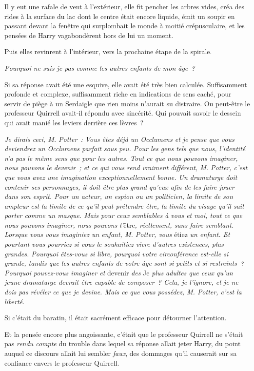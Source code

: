 Il y eut une rafale de vent à l'extérieur, elle fit pencher les arbres vides, créa des rides à la surface du lac dont le centre était encore liquide, émit un soupir en passant devant la fenêtre qui surplombait le monde à moitié crépusculaire, et les pensées de Harry vagabondèrent hors de lui un moment.

Puis elles revinrent à l'intérieur, vers la prochaine étape de la spirale.

\emph{Pourquoi ne suis-je pas comme les autres enfants de mon âge~?}

Si sa réponse avait été une esquive, elle avait été très bien calculée.
Suffisamment profonde et complexe, suffisamment riche en indications de sens caché, pour servir de piège à un Serdaigle que rien moins n'aurait su distraire.
Ou peut-être le professeur Quirrell avait-il répondu avec sincérité.
Qui pouvait savoir le dessein qui avait manié les leviers derrière ces lèvres~?

\emph{Je dirais ceci, M. Potter~: Vous êtes déjà un Occlumens et je pense que vous deviendrez un Occlumens parfait sous peu.
Pour les gens tels que nous, l'identité n'a pas le même sens que pour les autres.
Tout ce que nous pouvons imaginer, nous pouvons le devenir~; et ce qui vous rend vraiment différent, M. Potter, c'est que vous avez une imagination exceptionnellement bonne.
Un dramaturge doit contenir ses personnages, il doit être plus grand qu'eux afin de les faire jouer dans son esprit.
Pour un acteur, un espion ou un politicien, la limite de son ampleur est la limite de ce qu'il peut prétendre être, la limite du visage qu'il sait porter comme un masque.
Mais pour ceux semblables à vous et moi, tout ce que nous pouvons imaginer, nous pouvons l'}être\emph{, réellement, sans faire semblant.
Lorsque vous vous imaginiez un enfant, M. Potter, vous} étiez \emph{un enfant.
Et pourtant vous pourriez si vous le souhaitiez vivre d'autres existences, plus grandes.
Pourquoi êtes-vous si libre, pourquoi votre circonférence est-elle si grande, tandis que les autres enfants de votre âge sont si petits et si restreints~?
Pourquoi pouvez-vous imaginer et} devenir \emph{des} Je \emph{plus adultes que ceux qu'un jeune dramaturge devrait être capable de composer~?
Cela, je l'ignore, et je ne dois pas révéler ce que je devine.
Mais ce que vous possédez, M. Potter, c'est la liberté.}

Si c'était du baratin, il était sacrément efficace pour détourner l'attention.

Et la pensée encore plus angoissante, c'était que le professeur Quirrell ne s'était pas \emph{rendu compte} du trouble dans lequel sa réponse allait jeter Harry, du point auquel ce discours allait lui sembler \emph{faux}, des dommages qu'il causerait sur sa confiance envers le professeur Quirrell.

